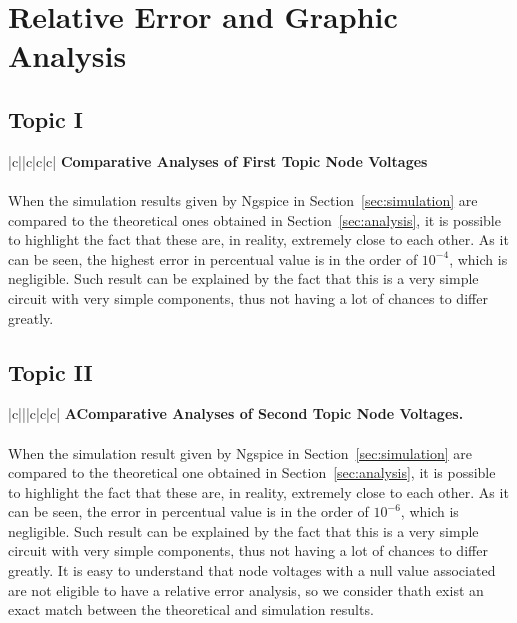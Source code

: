 \section{Relative Error and Graphic Analysis}
\label{sec:erroranalysis}

\subsection{Topic I}
\label{subsec:first_topic_error}

\begin{center}
   \begin{tabular}{|c||c|c|c|}
      \hline    
       {\bf Comparative Analyses of First Topic Node Voltages} \\
      \hline
        
   \end{tabular}
 \end{center}

\paragraph{} When the simulation results given by Ngspice in Section~\ref{sec:simulation} are compared to the theoretical ones obtained in Section~\ref{sec:analysis}, it is possible to highlight the fact that these are, in reality, extremely close to each other. As it can be seen, the highest error in percentual value is in the order of $10^{-4}$, which is negligible. Such result can be explained by the fact that this is a very simple circuit with very simple components, thus not having a lot of chances to differ greatly.

 
\subsection{Topic II}
\label{subsec:second_topic_error}

\begin{center}
   \begin{tabular}{|c|||c|c|c|}
      \hline    
       {\bf AComparative Analyses of Second Topic Node Voltages.} \\
      \hline
        
   \end{tabular}   
 \end{center}

\paragraph{} When the simulation result given by Ngspice in Section~\ref{sec:simulation} are compared to the theoretical one obtained in Section~\ref{sec:analysis}, it is possible to highlight the fact that these are, in reality, extremely close to each other. As it can be seen, the error in percentual value is in the order of $10^{-6}$, which is negligible. Such result can be explained by the fact that this is a very simple circuit with very simple components, thus not having a lot of chances to differ greatly. It is easy to understand that node voltages with a null value associated are not eligible to have a relative error analysis, so we consider thath exist an exact match between the theoretical and simulation results.
 
